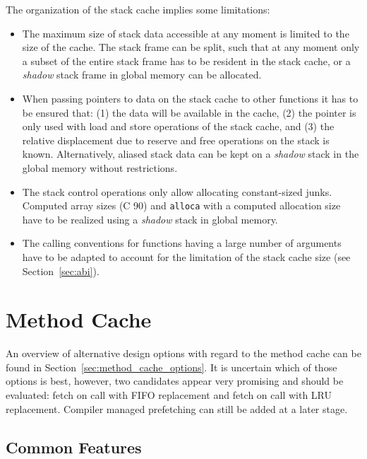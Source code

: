 \documentclass[a4paper,fontsize=10pt,twoside,DIV15,BCOR12mm,headinclude=true,footinclude=false,pagesize,bibtotoc]{scrbook}
\begin{document}
The organization of the stack cache implies some limitations:
\begin{itemize}
  \item The maximum size of stack data accessible at any moment is limited to
        the size of the cache. The stack frame can be split, such that at any
        moment only a subset of the entire stack frame has to be resident in the
        stack cache, or a \emph{shadow} stack frame in global memory can be
        allocated.
  \item When passing pointers to data on the stack cache to other functions it
        has to be ensured that: (1) the data will be available in the cache, (2)
        the pointer is only used  with load and store operations of the stack
        cache, and (3) the relative displacement due to reserve and free
        operations on the stack is known. Alternatively, aliased stack data can
        be kept on a \emph{shadow} stack in the global memory without
        restrictions.
  \item The stack control operations only allow allocating constant-sized junks.
        Computed array sizes (C 90) and \texttt{alloca} with a computed
        allocation size have to be realized using a \emph{shadow} stack in
        global memory.
  \item The calling conventions for functions having a large number of arguments
        have to be adapted to account for the limitation of the stack cache
        size (see Section~\ref{sec:abi}).
\end{itemize}



\section{Method Cache}
\label{sec:method-cache}

An overview of alternative design options with regard to the method cache can be
found in Section~\ref{sec:method_cache_options}. It is uncertain which of those
options is best, however, two candidates appear very promising and should
be evaluated: fetch on call with FIFO replacement and fetch on call with LRU
replacement. Compiler managed prefetching can still be added at a later stage.

\subsection{Common Features}
\end{document}
